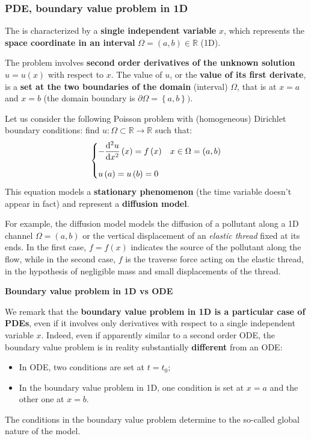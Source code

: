 \subsubsection{PDE, boundary value problem in 1D}

The  is characterized by a \textbf{single independent variable} $x$, which represents the \textbf{space coordinate in an interval} $\Omega = \left(a,b\right) \in \mathbb{R}$ (1D).

\highspace
The problem involves \textbf{second order derivatives of the unknown solution} $u = u\left(x\right)$ with respect to $x$. The value of $u$, or the \textbf{value of its first derivate}, is a \textbf{set at the two boundaries of the domain} (interval) $\Omega$, that is at $x = a$ and $x = b$ (the domain boundary is $\partial\Omega = \left\{a,b\right\})$.

\highspace
Let us consider the following Poisson problem with (homogeneous) Dirichlet boundary conditions: find $u : \Omega \subset \mathbb{R} \rightarrow \mathbb{R}$ such that:
\begin{equation}
    \begin{cases}
        -\dfrac{\mathrm{d}^{2}u}{\mathrm{d}x^{2}}\left(x\right) = f\left(x\right) & x \in \Omega = \left(a,b\right) \vspace{1em} \\
        u\left(a\right) = u\left(b\right) = 0
    \end{cases}
\end{equation}
This equation models a \textbf{stationary phenomenon} (the time variable doesn't appear in fact) and represent a \textbf{diffusion model}.

\highspace
\begin{examplebox}
    For example, the diffusion model models the diffusion of a pollutant along a 1D channel $\Omega = \left(a,b\right)$ or the vertical displacement of an \emph{elastic thread} fixed at its ends. In the first case, $f = f\left(x\right)$ indicates the source of the pollutant along the flow, while in the second case, $f$ is the traverse force acting on the elastic thread, in the hypothesis of negligible mass and small displacements of the thread.
\end{examplebox}

\noindent
\begin{flushleft}
    \textcolor{Green3}{ \textbf{Boundary value problem in 1D vs ODE}}
\end{flushleft}
We remark that the \textbf{boundary value problem in 1D is a particular case of PDEs}, even if it involves only derivatives with respect to a single independent variable $x$. Indeed, even if apparently similar to a second order ODE, the boundary value problem is in reality substantially \textbf{different} from an ODE:
\begin{itemize}
    \item In ODE, two conditions are set at $t = t_{0}$;
    \item In the boundary value problem in 1D, one condition is set at $x = a$ and the other one at $x = b$.
\end{itemize}
The conditions in the boundary value problem determine to the so-called global nature of the model.